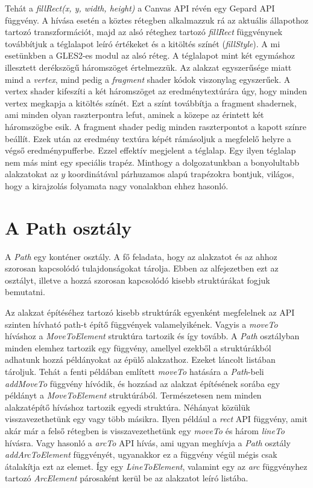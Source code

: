 \documentclass[12pt]{report}
\theoremstyle{definition}
\newcommand{\func}[1]{{\textsl{#1}}}
\begin{document}
Tehát a \func{fillRect(x, y, width, height)} a Canvas API révén egy Gepard API
függvény. A hívása esetén a köztes rétegben alkalmazzuk rá az aktuális
állapothoz tartozó transzformációt, majd az alsó réteghez tartozó
\func{fillRect} függvénynek továbbítjuk a téglalapot leíró értékeket és a
kitöltés színét (\func{fillStyle}). A mi esetünkben a GLES2-es modul az alsó
réteg. A téglalapot mint két egymáshoz illesztett derékszögű háromszöget
értelmezzük. Az alakzat egyszerűsége miatt mind a \emph{vertex}, mind pedig a
\emph{fragment} shader kódok viszonylag egyszerűek. A vertex shader kifeszíti a
két háromszöget az eredménytextúrára úgy, hogy minden vertex megkapja a
kitöltés színét. Ezt a színt továbbítja a fragment shadernek, ami minden olyan
raszterpontra lefut, aminek a közepe az érintett két háromszögbe esik. A
fragment shader pedig minden raszterpontot a kapott színre beállít. Ezek után
az eredmény textúra képét rámásoljuk a megfelelő helyre a végső
eredménypufferbe. Ezzel effektív megjelent a téglalap. Egy ilyen téglalap nem
más mint egy speciális trapéz. Minthogy a dolgozatunkban a bonyolultabb
alakzatokat az $y$ koordinátával párhuzamos alapú trapézokra bontjuk, világos,
hogy a kirajzolás folyamata nagy vonalakban ehhez hasonló.

    \section[A Path osztály]{A Path osztály}
    \label{sec:A_Path_osztály}

A \func{Path} egy konténer osztály. A fő feladata, hogy az alakzatot és az
ahhoz szorosan kapcsolódó tulajdonságokat tárolja. Ebben az alfejezetben ezt az
osztályt, illetve a hozzá szorosan kapcsolódó kisebb struktúrákat fogjuk
bemutatni.

Az alakzat építéséhez tartozó kisebb struktúrák egyenként megfelelnek az API
szinten hívható path-t építő függvények valamelyikének. Vagyis a \func{moveTo}
híváshoz a \func{MoveToElement} struktúra tartozik és így tovább. A \func{Path}
osztályban minden elemhez tartozik egy függvény, amellyel ezekből a
struktúrákból adhatunk hozzá példányokat az épülő alakzathoz. Ezeket láncolt
listában tároljuk. Tehát a fenti példában említett \func{moveTo} hatására a
\func{Path}-beli \func{addMoveTo} függvény hívódik, és hozzáad az alakzat
építésének sorába egy példányt a \func{MoveToElement} struktúrából.
Természetesen nem minden alakzatépítő híváshoz tartozik egyedi struktúra.
Néhányat közülük visszavezethetünk egy vagy több másikra. Ilyen például a
\func{rect} API függvény, amit akár már a felső rétegben is visszavezethetünk
egy \func{moveTo} és három \func{lineTo} hívásra. Vagy hasonló a \func{arcTo}
API hívás, ami ugyan meghívja a \func{Path} osztály \func{addArcToElement}
függvényét, ugyanakkor ez a függvény végül mégis csak átalakítja ezt az elemet.
Így egy \func{LineToElement}, valamint egy az \func{arc} függvényhez tartozó
\func{ArcElement} párosaként kerül be az alakzatot leíró listába.
\end{document}
